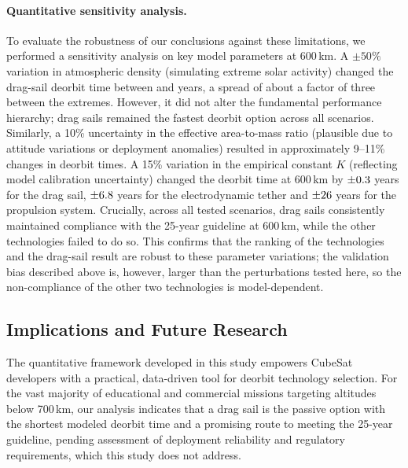 \documentclass[11pt,a4paper]{article}
\begin{document}
\paragraph{Quantitative sensitivity analysis.} To evaluate the robustness of our conclusions against these limitations, we performed a sensitivity analysis on key model parameters at 600\,km. A $\pm50\%$ variation in atmospheric density (simulating extreme solar activity) changed the drag-sail deorbit time between \DensLo{} and \DensHi{} years, a spread of about a factor of three between the extremes. However, it did not alter the fundamental performance hierarchy; drag sails remained the fastest deorbit option across all scenarios. Similarly, a 10\% uncertainty in the effective area-to-mass ratio (plausible due to attitude variations or deployment anomalies) resulted in approximately 9--11\% changes in deorbit times. A 15\% variation in the empirical constant $K$ (reflecting model calibration uncertainty) changed the deorbit time at 600\,km by $\pm0.3$ years for the drag sail, $\pm6.8$ years for the electrodynamic tether and $\pm26$ years for the propulsion system. Crucially, across all tested scenarios, drag sails consistently maintained compliance with the 25-year guideline at 600\,km, while the other technologies failed to do so. This confirms that the ranking of the technologies and the drag-sail result are robust to these parameter variations; the validation bias described above is, however, larger than the perturbations tested here, so the non-compliance of the other two technologies is model-dependent.

\subsection{Implications and Future Research}
The quantitative framework developed in this study empowers CubeSat developers with a practical, data-driven tool for deorbit technology selection. For the vast majority of educational and commercial missions targeting altitudes below 700\,km, our analysis indicates that a drag sail is the passive option with the shortest modeled deorbit time and a promising route to meeting the 25-year guideline, pending assessment of deployment reliability and regulatory requirements, which this study does not address.
\end{document}
